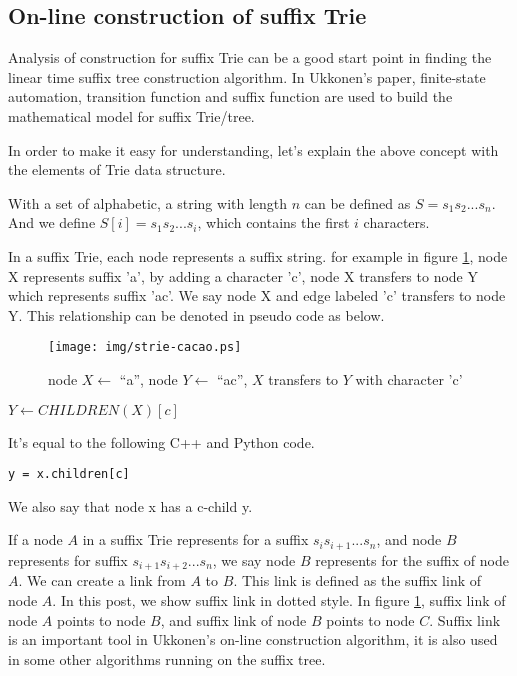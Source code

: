 \documentclass{article}
\begin{document}
\subsection{On-line construction of suffix Trie}

Analysis of construction for suffix Trie can be a good start point in finding
the linear time suffix tree construction algorithm. In Ukkonen's paper\cite{ukkonen95}, 
finite-state automation, transition function and suffix function are used to 
build the mathematical model for suffix Trie/tree. 

In order to make it easy for understanding, let's explain the above concept with
the elements of Trie data structure.

With a set of alphabetic, a string with length $n$ can be defined as $S=s_1s_2...s_n$.
And we define $S[i]=s_1s_2...s_i$, which contains the first $i$ characters.

In a suffix Trie, each node represents a suffix string. for example in figure 
\ref{fig:strie-cacao}, node X represents suffix 'a', by adding a character 'c',
node X transfers to node Y which represents suffix 'ac'. We say node X and edge labeled 'c'
transfers to node Y. This relationship can be denoted in pseudo code as below.

\begin{figure}[htbp]
   \begin{center}
     \texttt{[image: img/strie-cacao.ps]}
     \caption{node $X \leftarrow$ ``a'', node $Y \leftarrow$ ``ac'', $X$ transfers to $Y$ with character 'c'}
     \label{fig:strie-cacao}
   \end{center}
\end{figure}

$Y \leftarrow CHILDREN(X)[c]$

It's equal to the following C++ and Python code.

\lstset{language=python}
\begin{lstlisting}
y = x.children[c]
\end{lstlisting}

We also say that node x has a c-child y.

If a node $A$ in a suffix Trie represents for a suffix $s_is_{i+1}...s_n$, 
and node $B$ represents for suffix $s_{i+1}s_{i+2}...s_n$, we say node $B$
represents for the suffix of node $A$. We can create a link from $A$ to $B$.
This link is defined as the suffix link of node $A$. In this post, we show
suffix link in dotted style. In figure \ref{fig:strie-cacao}, suffix link of
node $A$ points to node $B$, and suffix link of node $B$ points to node $C$.
Suffix link is an important tool in Ukkonen's on-line construction algorithm,
it is also used in some other algorithms running on the suffix tree.
\end{document}
